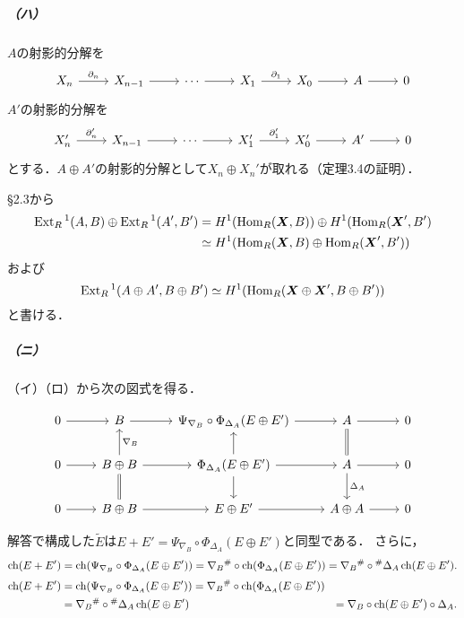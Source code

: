 \subparagraph{（ハ）}
$A$の射影的分解を
\[
\begin{tikzcd}
  X_n \arrow[r, "\partial_n"] & X_{n-1} \arrow[r] & \cdots \arrow[r] & X_1 \arrow[r, "\partial_1"] & X_0 \arrow[r] & A \arrow[r] & 0
\end{tikzcd}
\]
$A'$の射影的分解を
\[
\begin{tikzcd}
  X_n' \arrow[r, "\partial_n'"] & X_{n-1} \arrow[r] & \cdots \arrow[r] & X_1' \arrow[r, "\partial_1'"] & X_0' \arrow[r] & A' \arrow[r] & 0
\end{tikzcd}
\]
とする．$A \oplus A'$の射影的分解として$X_n \oplus X_n'$が取れる（定理3.4の証明）．

\S2.3から
\begin{align*}
  \operatorname{Ext}_R{}^1(A, B) \oplus \operatorname{Ext}_R{}^1(A', B') &= H^1(\operatorname{Hom}_R(\boldsymbol{X}, B)) \oplus H^1(\operatorname{Hom}_R(\boldsymbol{X}', B') \\
  &\simeq H^1(\operatorname{Hom}_R(\boldsymbol{X}, B) \oplus \operatorname{Hom}_R(\boldsymbol{X}', B'))
\end{align*}
および
\[ \operatorname{Ext}_R{}^1(A \oplus A', B \oplus B') \simeq H^1(\operatorname{Hom}_R(\boldsymbol{X} \oplus \boldsymbol{X}', B \oplus B')) \]
と書ける．

\subparagraph{（ニ）}
（イ）（ロ）から次の図式を得る．

\[
\begin{tikzcd}
  0 \arrow[r] & B \arrow[r] & \Psi_{\nabla_B} \circ \Phi_{\Delta_A}(E \oplus E') \arrow[r] & A \arrow[r]\arrow[d, equal] & 0 \\
  0 \arrow[r] & B \oplus B \arrow[r]\arrow[u, "\nabla_B"']\arrow[d, equal] & \Phi_{\Delta_A}(E \oplus E') \arrow[r]\arrow[u]\arrow[d] & A \arrow[r]\arrow[d, "\Delta_A"] & 0 \\
  0 \arrow[r] & B \oplus B \arrow[r] & E \oplus E' \arrow[r] & A \oplus A \arrow[r] & 0
\end{tikzcd}
\]

解答で構成した$\tilde{E}$は$E+E' = \Psi_{\nabla_B} \circ \Phi_{\Delta_A}(E \oplus E')$と同型である．
さらに，
\[ \operatorname{ch} (E + E') = \operatorname{ch}(\Psi_{\nabla_B} \circ \Phi_{\Delta_A}(E \oplus E')) = \nabla_B{}^\# \circ \operatorname{ch}( \Phi_{\Delta_A}(E \oplus E')) = \nabla_B{}^\# \circ {}^\#\Delta_A \operatorname{ch}(E \oplus E') . \]
\begin{align*}
\operatorname{ch} (E + E') &= \operatorname{ch}(\Psi_{\nabla_B} \circ \Phi_{\Delta_A}(E \oplus E')) = \nabla_B{}^\# \circ \operatorname{ch}( \Phi_{\Delta_A}(E \oplus E')) \\
&= \nabla_B{}^\# \circ {}^\#\Delta_A \operatorname{ch}(E \oplus E') & = \nabla_B \circ \operatorname{ch}(E \oplus E') \circ \Delta_A .
\end{align*}

